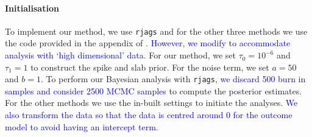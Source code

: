 \documentclass[preprint,12pt]{elsarticle}
\newcommand{\added}[1]{\textcolor{blue}{#1}}
\begin{document}
\paragraph{Initialisation} 
To implement our method, we use \texttt{rjags} \added{\citep{rjags2023}} and for the other three
methods we use the code provided in the appendix of \citep{koch2020}.
\added{However, we modify to accommodate analysis with `high dimensional'
	data.}
For our method, we set $\tau_0=10^{-6}$ and $\tau_1=1$ to construct the
spike and slab prior.
For the noise term, we set $a=50$ and $b=1$.
To perform 
our Bayesian analysis with \texttt{rjags}, \added{we discard 500 burn in samples and consider 2500 MCMC samples} to compute the
posterior estimates. For the other methods we use the in-built settings 
to initiate the analyses. \added{We also transform the data so that the data is centred around $0$
for the outcome model to avoid having an intercept term.}
\end{document}
